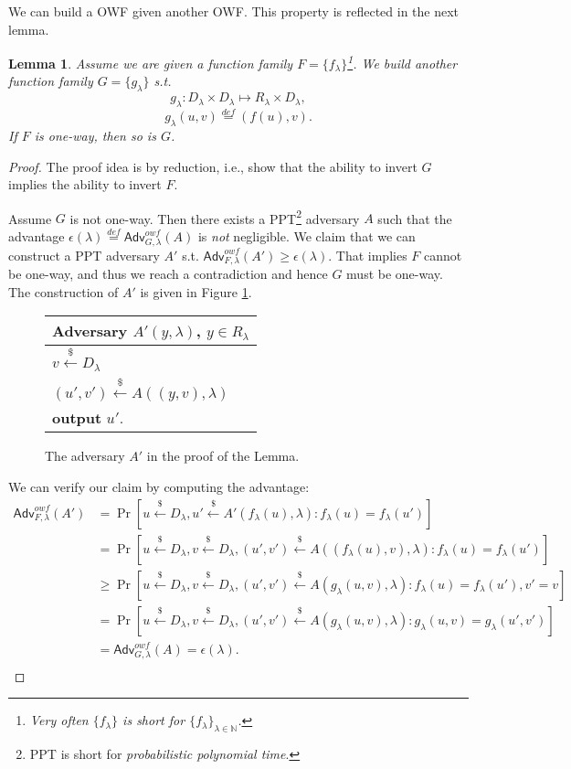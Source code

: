\documentclass[12pt]{article}
\newcommand{\eqdef}{\stackrel{def}{=}}
\newcommand{\N}{\mathbb{N}}
\newcommand{\getsr}{\stackrel{\$}{\gets}}
\newcommand{\Adv}{\textsf{Adv}}
\newtheorem{lemma}[theorem]{Lemma}
\theoremstyle{definition}
\begin{document}
We can build a OWF given another OWF. This property is reflected in the next lemma.
\begin{lemma}
Assume we are given a function family $F = \{f_\lambda\}$\footnote{Very often $ \{f_\lambda\}$ is short for $ \{f_\lambda\}_{\lambda\in\N}$.}.
We build another function family $G = \{g_\lambda\}$ s.t.
$$g_\lambda : D_\lambda \times D_\lambda \mapsto R_\lambda \times D_\lambda,$$
$$g_\lambda(u,v) \eqdef (f(u), v).$$
If $F$ is one-way, then so is $G$.
\end{lemma}
\begin{proof}
The proof idea is by reduction, i.e., show that the ability to invert $G$ implies the ability to invert $F$.

Assume $G$ is not one-way. Then there exists a PPT\footnote{PPT is short for \emph{probabilistic polynomial time}.} adversary $A$ such that the advantage $\epsilon(\lambda) \eqdef \Adv_{G,\lambda}^{owf}(A)$ is \emph{not} negligible. We claim that we can construct a PPT adversary $A'$ s.t. $\Adv_{F,\lambda}^{owf}(A') \geq \epsilon(\lambda)$. That implies $F$ cannot be one-way, and thus we reach a contradiction and hence $G$ must be one-way. The construction of $A'$ is given in Figure \ref{fig:ad}.

\begin{figure}[!h]
\centering
\begin{tabular}{l}
Adversary $A'(y,\lambda)$, $y\in R_\lambda$\\
\hline
$v \getsr D_\lambda$ \\
$(u',v') \getsr A((y,v),\lambda)$ \\
{\bf output} $u'$.\\
\end{tabular}
\caption{The adversary $A'$ in the proof of the Lemma.}
\label{fig:ad}
\end{figure}

We can verify our claim by computing the advantage:
$$
\begin{aligned}
\Adv_{F,\lambda}^{owf} (A') 
&= \Pr [u\getsr D_\lambda, u'\getsr A'(f_\lambda(u), \lambda) : f_\lambda(u) = f_\lambda(u')] \\
&= \Pr [u\getsr D_\lambda, v\getsr D_\lambda, (u', v')\getsr A((f_\lambda(u), v), \lambda) : f_\lambda(u) = f_\lambda(u')] \\
&\geq \Pr [u\getsr D_\lambda, v\getsr D_\lambda, (u', v')\getsr A(g_\lambda(u, v), \lambda) : f_\lambda(u) = f_\lambda(u'), v' = v] \\
&= \Pr [u\getsr D_\lambda, v\getsr D_\lambda, (u', v')\getsr A(g_\lambda(u, v), \lambda) : g_\lambda(u, v) = g_\lambda(u', v')] \\
&= \Adv_{G,\lambda}^{owf}(A) = \epsilon(\lambda). \\
\end{aligned}
$$
\end{proof}
\end{document}
